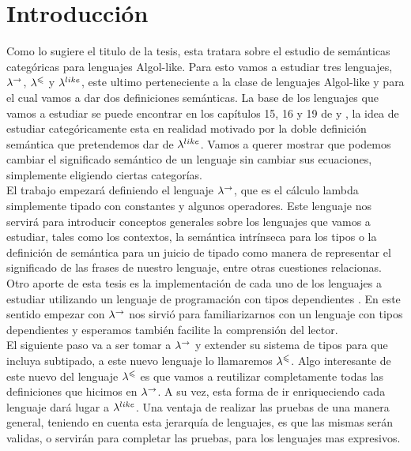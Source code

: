 \chapter{Introducci\'on}
\label{chap:intro}

Como lo sugiere el titulo de la tesis, esta tratara sobre el estudio
de sem\'anticas categ\'oricas para lenguajes Algol-like. Para esto
vamos a estudiar tres lenguajes, $\lambda^{\rightarrow}$, $\lambda^{\leqslant}$ y $\lambda^{like}$,
este ultimo perteneciente a la clase de lenguajes Algol-like y para el cual
vamos a dar dos definiciones sem\'anticas.
La base de los lenguajes que vamos a estudiar se puede encontrar en los
cap\'itulos 15, 16 y 19 de \cite{reynolds2009theories} y \cite{olesfunctorcategories}, 
la idea de estudiar
categ\'oricamente esta en realidad motivado por la doble definici\'on
sem\'antica que pretendemos dar de $\lambda^{like}$. Vamos a querer mostrar
que podemos cambiar el significado
sem\'antico de un lenguaje sin cambiar sus ecuaciones, simplemente
eligiendo ciertas categor\'ias.\\

El trabajo empezar\'a definiendo el lenguaje $\lambda^{\rightarrow}$, que es el
c\'alculo lambda simplemente tipado con constantes y algunos operadores.
Este lenguaje nos servir\'a para introducir conceptos generales sobre 
los lenguajes que vamos a estudiar, tales como
los contextos, la sem\'antica intr\'inseca para los tipos o la definici\'on
de sem\'antica para un juicio de tipado como manera de representar el significado
de las frases de nuestro lenguaje, entre otras cuestiones relacionas. 
Otro aporte de esta tesis es la implementaci\'on de cada uno de los lenguajes
a estudiar utilizando un lenguaje de programaci\'on con tipos dependientes 
\cite{idrislanguage}. 
En este sentido empezar con $\lambda^{\rightarrow}$ nos sirvi\'o para
familiarizarnos con un lenguaje con tipos dependientes y esperamos tambi\'en
facilite la comprensi\'on del lector.\\

El siguiente paso va a ser tomar a $\lambda^{\rightarrow}$ y extender su sistema de 
tipos para que incluya subtipado, a este nuevo lenguaje lo llamaremos
$\lambda^{\leqslant}$. Algo interesante de este nuevo del lenguaje $\lambda^{\leqslant}$
es que vamos a reutilizar completamente todas las definiciones que hicimos
en $\lambda^{\rightarrow}$. A su vez, esta forma de ir enriqueciendo cada lenguaje 
dar\'a lugar a $\lambda^{like}$. Una ventaja de realizar las pruebas de una manera 
general, teniendo en cuenta esta jerarqu\'ia de lenguajes, es que las mismas
ser\'an validas, o servir\'an para completar las pruebas, para los
lenguajes mas expresivos.\\

